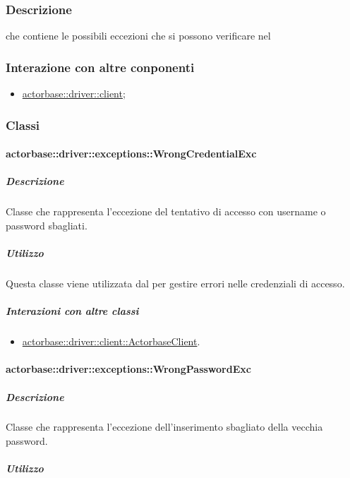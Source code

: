 \documentclass{scalatekids-article}
\begin{document}
\subsubsection{Descrizione}

 che contiene le possibili eccezioni che si possono verificare nel 

\subsubsection{Interazione con altre conponenti}
\begin{itemize}
\item \hyperref[sec:actorbase::driver::client]{actorbase::driver::client};
\end{itemize}

\subsubsection{Classi}

\paragraph{actorbase::driver::exceptions::WrongCredentialExc}

\subparagraph{Descrizione}

Classe che rappresenta l'eccezione del tentativo di accesso con username o password sbagliati.

\subparagraph{Utilizzo}

Questa classe viene utilizzata dal  per gestire errori nelle credenziali di accesso.

\subparagraph{Interazioni con altre classi}

\begin{itemize}
\item \hyperref[sec:actorbase::driver::client::ActorbaseClient]{actorbase::driver::client::ActorbaseClient}.
\end{itemize}

\paragraph{actorbase::driver::exceptions::WrongPasswordExc}

\subparagraph{Descrizione}

Classe che rappresenta l'eccezione dell'inserimento sbagliato della vecchia password.

\subparagraph{Utilizzo}
\end{document}

